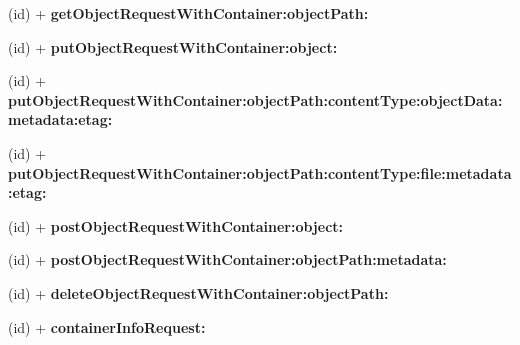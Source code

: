 \begin{DoxyCompactItemize}
\item 
\hypertarget{interface_a_s_i_cloud_files_object_request_ac41ac1686f40dd0b25f473b95de56a2b}{
(id) + {\bfseries get\-Object\-Request\-With\-Container\-:object\-Path\-:}}
\label{interface_a_s_i_cloud_files_object_request_ac41ac1686f40dd0b25f473b95de56a2b}

\item 
\hypertarget{interface_a_s_i_cloud_files_object_request_ac9c57b5595d42ea6fdb13b9baa5ad073}{
(id) + {\bfseries put\-Object\-Request\-With\-Container\-:object\-:}}
\label{interface_a_s_i_cloud_files_object_request_ac9c57b5595d42ea6fdb13b9baa5ad073}

\item 
\hypertarget{interface_a_s_i_cloud_files_object_request_a51fd51b32cb64756aa6fbc3f50ff7df4}{
(id) + {\bfseries put\-Object\-Request\-With\-Container\-:object\-Path\-:content\-Type\-:object\-Data\-:metadata\-:etag\-:}}
\label{interface_a_s_i_cloud_files_object_request_a51fd51b32cb64756aa6fbc3f50ff7df4}

\item 
\hypertarget{interface_a_s_i_cloud_files_object_request_a4fd2c82bc1702341d5a482f7ff46db4b}{
(id) + {\bfseries put\-Object\-Request\-With\-Container\-:object\-Path\-:content\-Type\-:file\-:metadata\-:etag\-:}}
\label{interface_a_s_i_cloud_files_object_request_a4fd2c82bc1702341d5a482f7ff46db4b}

\item 
\hypertarget{interface_a_s_i_cloud_files_object_request_ae713a0e0f7867895b33210be74770c47}{
(id) + {\bfseries post\-Object\-Request\-With\-Container\-:object\-:}}
\label{interface_a_s_i_cloud_files_object_request_ae713a0e0f7867895b33210be74770c47}

\item 
\hypertarget{interface_a_s_i_cloud_files_object_request_a594d1d7c8fc812dc9acc2c862809b603}{
(id) + {\bfseries post\-Object\-Request\-With\-Container\-:object\-Path\-:metadata\-:}}
\label{interface_a_s_i_cloud_files_object_request_a594d1d7c8fc812dc9acc2c862809b603}

\item 
\hypertarget{interface_a_s_i_cloud_files_object_request_a55f1c9c4f71e7e3314b23d144b96fbac}{
(id) + {\bfseries delete\-Object\-Request\-With\-Container\-:object\-Path\-:}}
\label{interface_a_s_i_cloud_files_object_request_a55f1c9c4f71e7e3314b23d144b96fbac}

\item 
\hypertarget{interface_a_s_i_cloud_files_object_request_ab9af59ae6c15be52c702e45fca805db9}{
(id) + {\bfseries container\-Info\-Request\-:}}
\label{interface_a_s_i_cloud_files_object_request_ab9af59ae6c15be52c702e45fca805db9}


\end{DoxyCompactItemize}

